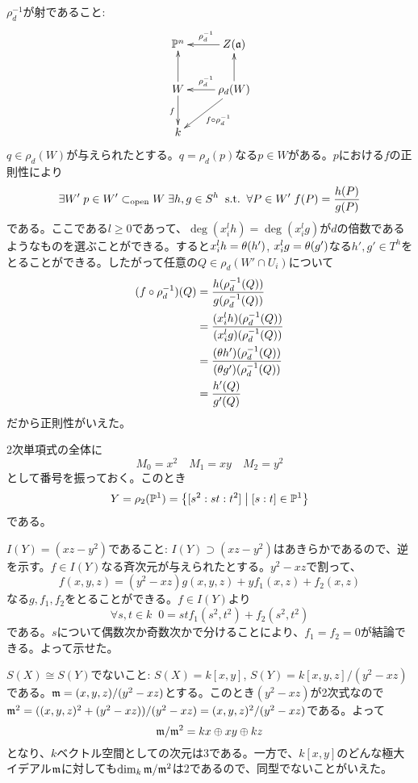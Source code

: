   $\rho_d^{-1}$が射であること:
  \[
  \xymatrix{
  \P^n  & Z(\fraka) \ar[l]_{\rho_d^{-1}} \\
  W  \ar[u] \ar[d]_f   &  \rho_d(W) \ar[u] \ar[l]_{\rho_d^{-1}}  \ar[dl]^{f \circ \rho_d^{-1}} \\
  k &  {}
  }
  \]
  $q \in \rho_d(W)$が与えられたとする。$q = \rho_d(p)$なる$p \in W$がある。$p$における$f$の正則性により
  \[
  \exists W' \; p \in W' \subset_{\text{open}} W \; \exists h,g \in S^h \; \; \text{s.t.} \; \; \forall P \in W' \; f(P) = \frac{h(P)}{g(P)}
  \]
  である。ここである$l \geq 0$であって、$\deg (x_i^lh ) = \deg (x_i^lg )$が$d$の倍数であるようなものを選ぶことができる。すると$x_i^lh = {\theta} (h')$, $x_i^lg = {\theta} (g')$なる$h', g' \in T^h$をとることができる。したがって任意の$Q \in \rho_d(W' \cap U_i)$について
  \begin{align*}
    (f \circ \rho_d^{-1})(Q) &= \frac{ h(\rho_d^{-1}(Q)) }{ g(\rho_d^{-1}(Q)) } \\
    &=  \frac{ (x_i^l h)(\rho_d^{-1}(Q)) }{ (x_i^l g)(\rho_d^{-1}(Q)) } \\
    &= \frac{ ({\theta} h')(\rho_d^{-1}(Q)) }{ ({\theta} g')(\rho_d^{-1}(Q)) } \\
    &= \frac{ h'(Q) }{ g'(Q) }
  \end{align*}
  だから正則性がいえた。





2次単項式の全体に
\[
M_0 = x^2 \quad M_1 = xy \quad M_2 = y^2
\]
として番号を振っておく。このとき
\[
Y = \rho_2({\mathbb P}^1) = \left\{ [s^2 : st : t^2 ]  \mathrel{} \middle| \mathrel{} [s : t] \in {\mathbb P}^1 \right\}
\]
である。


$I(Y) = (xz - y^2)$であること: $I(Y) \supset (xz - y^2)$はあきらかであるので、逆を示す。$f \in I(Y)$なる斉次元が与えられたとする。$y^2 - xz$で割って、
  \[
  f(x,y,z )=(y^2 - xz)g(x,y,z) + yf_1(x,z) + f_2(x,z)
  \]
  なる$g, f_1,f_2$をとることができる。$f \in I(Y)$より
  \[
  \forall s,t \in k \; \; 0 = stf_1(s^2,t^2) + f_2(s^2, t^2)
  \]
  である。$s$について偶数次か奇数次かで分けることにより、$f_1 = f_2 = 0$が結論できる。よって示せた。

$S(X) \cong S(Y)$でないこと: $S(X) =k[x,y]$, $S(Y) = k[x,y,z]/(y^2-xz)$である。$\mathfrak{m} = (x,y,z)/(y^2-xz)$とする。このとき$(y^2-xz)$が2次式なので$\mathfrak{m}^2 = ((x,y,z)^2 + (y^2-xz) )/(y^2-xz) = (x,y,z)^2 /(y^2-xz)$である。よって
  \[
  \mathfrak{m} / \mathfrak{m}^2 = kx \oplus xy \oplus kz
  \]
  となり、$k$ベクトル空間としての次元は$3$である。一方で、$k[x,y]$のどんな極大イデアル$\mathfrak{m}$に対しても$\dim_k \mathfrak{m} / \mathfrak{m}^2$は$2$であるので、同型でないことがいえた。

